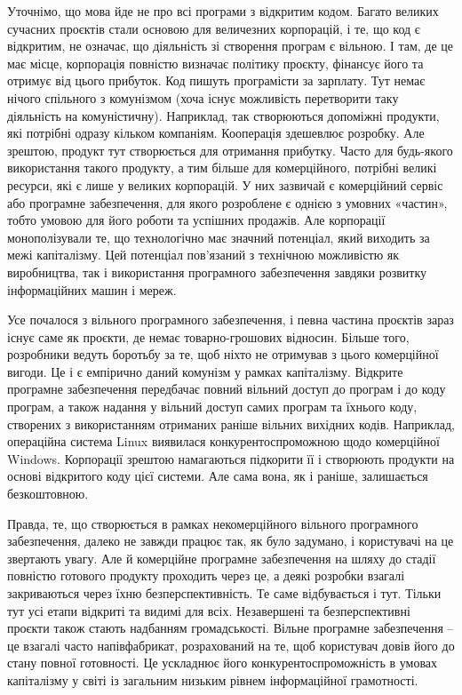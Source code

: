 \documentclass[../main]{subfiles}
\begin{document}
Уточнімо, що мова йде не про всі програми з відкритим кодом. Багато великих сучасних проєктів стали основою для величезних корпорацій, і те, що код є відкритим, не означає, що діяльність зі створення програм є вільною. І там, де це має місце, корпорація повністю визначає політику проєкту, фінансує його та отримує від цього прибуток. Код пишуть програмісти за зарплату. Тут немає нічого спільного з комунізмом (хоча існує можливість перетворити таку діяльність на комуністичну). Наприклад, так створюються допоміжні продукти, які потрібні одразу кільком компаніям. Кооперація здешевлює розробку. Але зрештою, продукт тут створюється для отримання прибутку. Часто для будь-якого використання такого продукту, а тим більше для комерційного, потрібні великі ресурси, які є лише у великих корпорацій. У них зазвичай є комерційний сервіс або програмне забезпечення, для якого розроблене є однією з умовних «частин», тобто умовою для його роботи та успішних продажів. Але корпорації монополізували те, що технологічно має значний потенціал, який виходить за межі капіталізму. Цей потенціал пов’язаний з технічною можливістю як виробництва, так і використання програмного забезпечення завдяки розвитку інформаційних машин і мереж.

Усе почалося з вільного програмного забезпечення, і певна частина проєктів зараз існує саме як проєкти, де немає товарно-грошових відносин. Більше того, розробники ведуть боротьбу за те, щоб ніхто не отримував з цього комерційної вигоди. Це і є емпірично даний комунізм у рамках капіталізму. Відкрите програмне забезпечення передбачає повний вільний доступ до програм і до коду програм, а також надання у вільний доступ самих програм та їхнього коду, створених з використанням отриманих раніше вільних вихідних кодів. Наприклад, операційна система Linux виявилася конкурентоспроможною щодо комерційної Windows. Корпорації зрештою намагаються підкорити її і створюють продукти на основі відкритого коду цієї системи. Але сама вона, як і раніше, залишається безкоштовною.

Правда, те, що створюється в рамках некомерційного вільного програмного забезпечення, далеко не завжди працює так, як було задумано, і користувачі на це звертають увагу. Але й комерційне програмне забезпечення на шляху до стадії повністю готового продукту проходить через це, а деякі розробки взагалі закриваються через їхню безперспективність. Те саме відбувається і тут. Тільки тут усі етапи відкриті та видимі для всіх. Незавершені та безперспективні проєкти також стають надбанням громадськості. Вільне програмне забезпечення – це взагалі часто напівфабрикат, розрахований на те, щоб користувач довів його до стану повної готовності. Це ускладнює його конкурентоспроможність в умовах капіталізму у світі із загальним низьким рівнем інформаційної грамотності.
\end{document}
